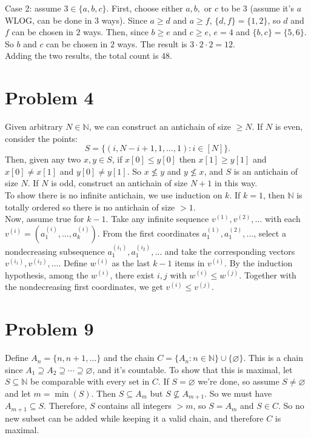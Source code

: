 \documentclass{article}
\begin{document}
Case 2: assume $3 \in \{a, b, c\}$. First, choose either $a, b,$ or $c$ to be $3$ (assume it's $a$ WLOG, can be done in $3$ ways). Since $a \ge d$ and $a \ge f$, $\{d, f\} = \{1, 2\}$, so $d$ and $f$ can be chosen in $2$ ways. Then, since $b \ge e$ and $c \ge e$, $e = 4$ and $\{b, c\} = \{5, 6\}$. So $b$ and $c$ can be chosen in $2$ ways. The result is $3\cdot 2\cdot 2 = 12$. \\

Adding the two results, the total count is $48$.

\section*{Problem 4}

Given arbitrary $N \in \mathbb{N}$, we can construct an antichain of size $\ge N$. If $N$ is even, consider the points:
$$S = \{(i, N - i + 1, 1, \ldots, 1): i \in [N]\}.$$
Then, given any two $x, y \in S$, if $x[0] \le y[0]$ then $x[1] \ge y[1]$ and $x[0] \neq x[1]$ and $y[0] \neq y[1]$. So $x \not\le y$ and $y \not\le x$, and $S$ is an antichain of size $N$. If $N$ is odd, construct an antichain of size $N + 1$ in this way. \\

To show there is no infinite antichain, we use induction on $k$. If $k = 1$, then $\mathbb{N}$ is totally ordered so there is no antichain of size $> 1$. \\

Now, assume true for $k - 1$. Take any infinite sequence $v^{(1)}, v^{(2)}, \ldots$ with each $v^{(i)} = (a^{(i)}_1, \ldots, a^{(i)}_k)$. From the first coordinates $a^{(1)}_1, a^{(2)}_1, \ldots$, select a nondecreasing subsequence $a^{(i_1)}_1, a^{(i_2)}_1, \ldots$ and take the corresponding vectors $v^{(i_1)}, v^{(i_2)}, \ldots$. Define $w^{(i)}$ as the last $k - 1$ items in $v^{(i)}$. By the induction hypothesis, among the $w^{(i)}$, there exist $i, j$ with $w^{(i)} \le w^{(j)}$. Together with the nondecreasing first coordinates, we get $v^{(i)} \le v^{(j)}$.

\section*{Problem 9}
Define $A_n = \{n, n + 1, \ldots\}$ and the chain $C = \{A_n: n \in \mathbb{N}\} \cup \{\varnothing\}$. This is a chain since $A_1 \supseteq A_2 \supseteq \cdots \supseteq \varnothing$, and it's countable. To show that this is maximal, let $S \subseteq \mathbb{N}$ be comparable with every set in $C$. If $S = \varnothing$ we're done, so assume $S \neq \varnothing$ and let $m = \min(S)$. Then $S \subseteq A_m$ but $S \not\subseteq A_{m + 1}$. So we must have $A_{m + 1} \subseteq S$. Therefore, $S$ contains all integers $> m$, so $S = A_m$ and $S \in C$. So no new subset can be added while keeping it a valid chain, and therefore $C$ is maximal.
\end{document}

